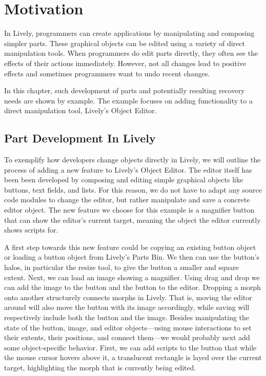 \chapter{Motivation} \label{chapter:MOTIVATION}

In Lively, programmers can create applications by manipulating and composing simpler parts.
These graphical objects can be edited using a variety of direct manipulation tools.
When programmers do edit parts directly, they often see the effects of their actions immediately.
However, not all changes lead to positive effects and sometimes programmers want to undo recent changes.

In this chapter, such development of parts and potentially resulting recovery needs are shown by example.
The example focuses on adding functionality to a direct manipulation tool, Lively's Object Editor.



\section{Part Development In Lively}

To exemplify how developers change objects directly in Lively, we will outline the process of adding a new feature to Lively's Object Editor.
The editor itself has been been developed by composing and editing simple graphical objects like buttons, text fields, and lists.
For this reason, we do not have to adapt any source code modules to change the editor, but rather manipulate and save a concrete editor object.
The new feature we choose for this example is a magnifier button that can show the editor's current target, meaning the object the editor currently shows scripts for.

A first step towards this new feature could be copying an existing button object or loading a button object from Lively's Parts Bin.
We then can use the button's halos, in particular the resize tool, to give the button a smaller and square extent.
Next, we can load an image showing a magnifier.
Using drag and drop we can add the image to the button and the button to the editor.
Dropping a morph onto another structurely connects morphs in Lively.
That is, moving the editor around will also move the button with its image accordingly, while saving will respectively include both the button and the image.
Besides manipulating the state of the button, image, and editor objects---using mouse interactions to set their extents, their positions, and connect them---we would probably next add some object-specific behavior.
First, we can add scripts to the button that while the mouse cursor hovers above it, a translucent rectangle is layed over the current target, highlighting the morph that is currently being edited.

